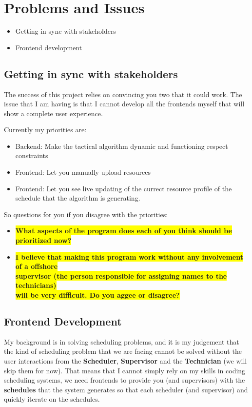 \section{Problems and Issues}
\begin{itemize}
	\item Getting in sync with stakeholders
	\item Frontend development
\end{itemize}

\subsection{Getting in sync with stakeholders}
The success of this project relies on convincing you two that it
could work. The issue that I am having is that I cannot develop all the frontends
myself that will show a complete user experience.

Currently my priorities are:
\begin{itemize} 
	\item Backend: Make the tactical algorithm dynamic and functioning respect constraints 
	\item Frontend: Let you manually upload resources
	\item Frontend: Let you see live updating of the currect resource profile of the schedule 
		that the algorithm is generating.
\end{itemize}

So questions for you if you disagree with the priorities:
\begin{itemize}
	\item \colorbox{yellow}{\textbf{What aspects of the program does each of you think should be prioritized now?}}
	\item \colorbox{yellow}{\textbf{I believe that making this program work without any involvement of a offshore}}	\\
    	\colorbox{yellow}{\textbf{supervisor (the person responsible for assigning names to the technicians) }} \\
		\colorbox{yellow}{\textbf{will be very difficult. Do you aggee or disagree?}}
\end{itemize} 

\subsection{Frontend Development}
My background is in solving scheduling problems, and it is 
my judgement that the kind of scheduling problem that we are facing cannot be solved
without the user interactions from the \textbf{Scheduler}, \textbf{Supervisor} 
and the \textbf{Technician} (we will skip them for now). That means that I cannot 
simply rely on my skills in coding scheduling systems, we need frontends to provide 
you (and supervisors) with the \textbf{schedules} that the system generates so that 
each scheduler (and supervisor) and quickly iterate on the schedules. 
